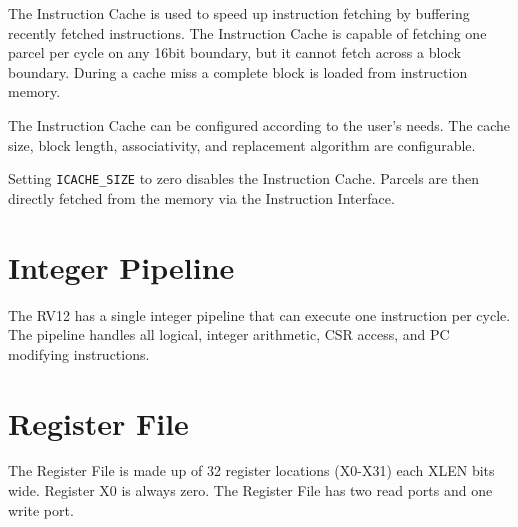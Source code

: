 The Instruction Cache is used to speed up instruction fetching by
buffering recently fetched instructions. The Instruction Cache is
capable of fetching one parcel per cycle on any 16bit boundary, but it
cannot fetch across a block boundary. During a cache miss a complete
block is loaded from instruction memory.

The Instruction Cache can be configured according to the user's needs.
The cache size, block length, associativity, and replacement algorithm
are configurable.

Setting \texttt{ICACHE\_SIZE} to zero disables the Instruction Cache. Parcels are
then directly fetched from the memory via the Instruction Interface.

\section{Integer Pipeline}\label{integer-pipeline}

The RV12 has a single integer pipeline that can execute one instruction per cycle.
The pipeline handles all logical, integer arithmetic, CSR access, and PC
modifying instructions.


\section{Register File}\label{register-file}

The Register File is made up of 32 register locations (X0-X31) each XLEN
bits wide. Register X0 is always zero. The Register File has two read
ports and one write port.
